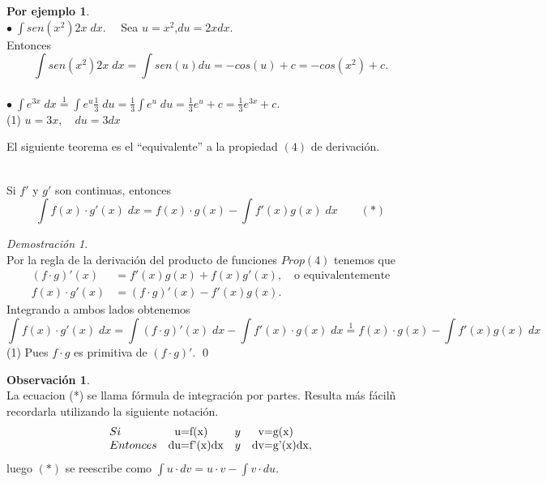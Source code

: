 \documentclass{article}
\theoremstyle{definition}
\newtheorem*{obs}{Observación}
\newtheorem*{ej}{Por ejemplo}
\theoremstyle{remark}
\newtheorem*{demo}{Demostración}
\newcommand\bl{$\bullet\;$}
\begin{document}
\begin{ej} \; \\

\bl $\int{sen(x^2)2x\;dx}.\quad$ Sea $u=x^2$,\quad $du=2xdx$.
\\Entonces\[
\int{sen(x^2)2x\;dx}=\int{sen(u)du}=-cos(u)+c=-cos(x^2)+c. \]
\\
\bl ${\int{e^{3x}\;dx}}\overset{1}{=}\int{e^u}\frac{1}{3}\;du=\frac{1}{3}\int{e^u\;du}=\frac{1}{3}e^u+c=\frac{1}{3}e^{3x}+c$.\\
(1) $u=3x,\quad du=3dx$
\end{ej}
El siguiente teorema es el ``equivalente'' a la propiedad $(4)$ de derivación. 
\pagebreak
\begin{teo}\; \\
Si $f'$ y $g'$ son continuas, entonces \[
\int{f(x)\cdot g'(x)\; dx}=f(x)\cdot g(x) - \int{f'(x)g(x)\;dx}\quad \quad (*) \]
\end{teo}
\begin{demo} \; \\
  Por la regla de la derivación del producto de funciones $Prop (4)$ tenemos que
\begin{align*}
    (f\cdot g)'(x)  &= f'(x)g(x)+f(x)g'(x),\quad \text{o equivalentemente}\\
    f(x)\cdot g'(x) &= (f\cdot g)'(x)-f'(x)g(x).
\end{align*}
Integrando a ambos lados obtenemos
\[
\int{f(x) \cdot g'(x)\; dx}=\int{(f\cdot g)'(x)\;dx}-\int{f'(x)\cdot g(x)\; dx}\overset{1}{=}f(x)\cdot g(x)-\int{f'(x) g(x)\; dx}\]
(1) Pues $f\cdot g$ es primitiva de $(f\cdot g)'$.  \qed
\end{demo}
\begin{obs} \; \\
  La ecuacion (*) se llama fórmula de integración por partes. Resulta más fácilñ recordarla utilizando la siguiente notación.
\[
  \begin{array}[t]{llcl}
  Si       & $\;\;u=f(x)$     & y & $\;\;v=g(x)$ \\
  Entonces & $du=f'(x)dx$ & y & $dv=g'(x)dx$,
    \end{array}
\]
luego $(*)$ se reescribe como $\int{u\cdot dv}=u\cdot v-\int{v\cdot du}$.
\end{obs}
\end{document}

